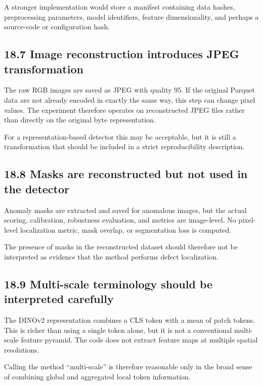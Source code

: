 \documentclass[
  11pt,
]{article}
\begin{document}
A stronger implementation would store a manifest containing data hashes,
preprocessing parameters, model identifiers, feature dimensionality, and
perhaps a source-code or configuration hash.

\subsection{18.7 Image reconstruction introduces JPEG
transformation}\label{image-reconstruction-introduces-jpeg-transformation}

The raw RGB images are saved as JPEG with quality 95. If the original
Parquet data are not already encoded in exactly the same way, this step
can change pixel values. The experiment therefore operates on
reconstructed JPEG files rather than directly on the original byte
representation.

For a representation-based detector this may be acceptable, but it is
still a transformation that should be included in a strict
reproducibility description.

\subsection{18.8 Masks are reconstructed but not used in the
detector}\label{masks-are-reconstructed-but-not-used-in-the-detector}

Anomaly masks are extracted and saved for anomalous images, but the
actual scoring, calibration, robustness evaluation, and metrics are
image-level. No pixel-level localization metric, mask overlap, or
segmentation loss is computed.

The presence of masks in the reconstructed dataset should therefore not
be interpreted as evidence that the method performs defect localization.

\subsection{18.9 Multi-scale terminology should be interpreted
carefully}\label{multi-scale-terminology-should-be-interpreted-carefully}

The DINOv2 representation combines a CLS token with a mean of patch
tokens. This is richer than using a single token alone, but it is not a
conventional multi-scale feature pyramid. The code does not extract
feature maps at multiple spatial resolutions.

Calling the method ``multi-scale'' is therefore reasonable only in the
broad sense of combining global and aggregated local token information.
\end{document}
